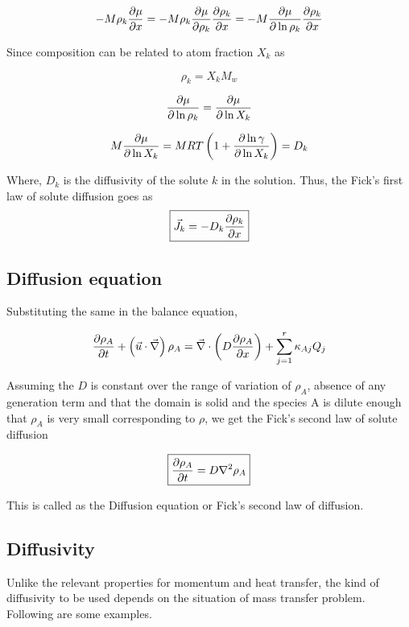 $$ -M \rho_k {\partial \mu \over \partial x} = - M \rho_k {\partial \mu \over \partial
\rho_k}{\partial \rho_k \over \partial x} = -M{\partial \mu \over \partial \ln \rho_k}{\partial
\rho_k \over \partial x} $$

Since composition can be related to atom fraction $X_k$ as 

$$ \rho_k = X_k M_w $$ 

$${\partial \mu \over \partial \ln \rho_k} = {\partial \mu \over \partial \ln X_k}$$

$$ M{\partial \mu \over \partial \ln X_k} = MRT \left( 1 + {\partial \ln \gamma
\over \partial \ln X_k} \right) = D_k $$

Where, $D_k$ is the diffusivity of the solute $k$ in the solution. Thus, the Fick's
first law of solute diffusion goes as
\begin{equation}
\boxed{
  \vec{J}_k = -D_k {\partial \rho_k \over \partial x}
}
\label{ficks-1}
\end{equation}

\subsection{Diffusion equation}

Substituting the same in the balance equation,

\begin{equation}
{\partial \rho_A \over \partial t} + \left( \vec{u} \cdot \vec{\nabla} \right) \rho_A =
\vec{\nabla} \cdot \left( D {\partial \rho_A \over \partial x} \right) + \sum_{j=1}^{r}{\kappa_{Aj}Q_j}
\end{equation}

Assuming the $D$ is constant over the range of variation of $\rho_A$, absence of any
generation term and that the domain is solid and the species A is dilute enough that $\rho_A$ is very small corresponding to $\rho$, we get the Fick's second law of
solute diffusion

\begin{equation}
\boxed{
{\partial \rho_A \over \partial t} = D \nabla^2 \rho_A
}
\end{equation}

This is called as the Diffusion equation or Fick's second law of diffusion.

\subsection{Diffusivity}

Unlike the relevant properties for momentum and heat transfer, the kind of
diffusivity to be used depends on the situation of mass transfer problem.
Following are some examples.

